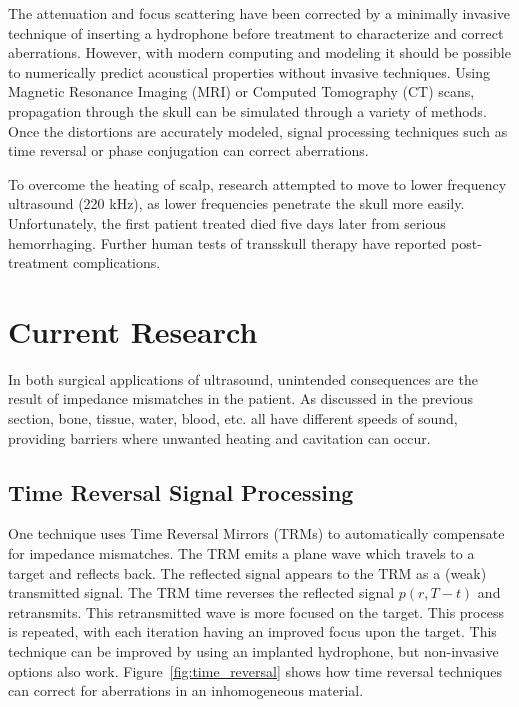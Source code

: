 \documentclass[letter,12pt,titlepage]{article}
\begin{document}
		The attenuation and focus scattering have been corrected by a minimally invasive technique of inserting a hydrophone before treatment to characterize and correct aberrations. \cite{Thomas_1996} However, with modern computing and modeling it should be possible to numerically predict acoustical properties without invasive techniques. Using Magnetic Resonance Imaging (MRI) or Computed Tomography (CT) scans, propagation through the skull can be simulated through a variety of methods. Once the distortions are accurately modeled, signal processing techniques such as time reversal or phase conjugation can correct aberrations. \cite{Marquet_2013}
		
		To overcome the heating of scalp, research attempted to move to lower frequency ultrasound (220 kHz), as lower frequencies penetrate the skull more easily. \cite{Sun_1998} Unfortunately, the first patient treated died five days later from serious hemorrhaging. Further human tests of transskull therapy have reported post-treatment complications. \cite{Marquet_2013}
		
\section{Current Research}
		
	In both surgical applications of ultrasound, unintended consequences are the result of impedance mismatches in the patient. As discussed in the previous section, bone, tissue, water, blood, etc. all have different speeds of sound, providing barriers where unwanted heating and cavitation can occur.  
	
	\subsection{Time Reversal Signal Processing}
	
		One technique uses Time Reversal Mirrors (TRMs) to automatically compensate for impedance mismatches. The TRM emits a plane wave which travels to a target and reflects back. The reflected signal appears to the TRM as a (weak) transmitted signal. The TRM time reverses the reflected signal $p(r,T-t)$ and retransmits. This retransmitted wave is more focused on the target. This process is repeated, with each iteration having an improved focus upon the target.  This technique can be improved by using an implanted hydrophone, but non-invasive options also work. \cite{Chakroun_1995} \cite{Thomas_1996} Figure~\ref{fig:time_reversal} shows how time reversal techniques can correct for aberrations in an inhomogeneous material.
		
\end{document}
